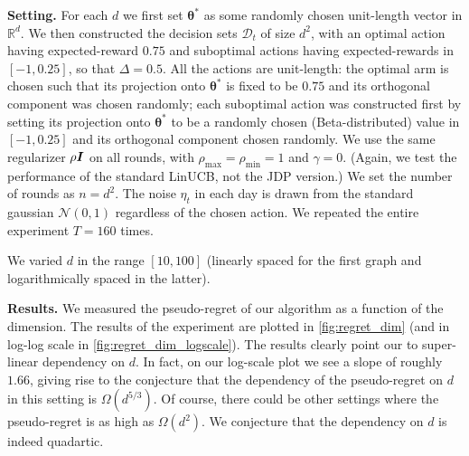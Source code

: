 \documentclass{article}
\renewcommand{\vec}[1]{\bm{#1}}
\newcommand{\Real}{\mathds{R}}
\newcommand{\D}{\mathcal{D}}
\newcommand{\Normal}{\mathcal{N}}
\newcommand{\Eye}[1][]{\bm{I}\notblank{#1}{_{{#1}\times{#1}}}{}}
\renewcommand{\paragraph}[1]{\vspace{2pt}\noindent\textbf{#1}}
\begin{document}
\paragraph{Setting.} For each $d$ we first set $\vec\theta^*$ as some randomly chosen unit-length vector in $\Real^d$. We then constructed the decision sets $\D_t$ of size
$d^2$, with an optimal action having expected-reward $0.75$ and suboptimal actions
having expected-rewards in $[-1, 0.25]$, so that $\Delta = 0.5$.  All the
actions are unit-length: the optimal arm is chosen such that its projection onto $\vec\theta^*$ is fixed to be $0.75$ and its orthogonal component was chosen randomly; each suboptimal action was constructed first by setting its projection onto $\vec \theta^*$ to be a randomly chosen (Beta-distributed) value in $[-1,0.25]$ and its orthogonal component chosen randomly.  We use the same
regularizer $\rho\Eye$ on all rounds, with
$\rho_{\max}=\rho_{\min}=1$ and $\gamma=0$. (Again, we test the performance of the standard LinUCB, not the JDP version.)  We set the number of
rounds as $n=d^2$. The noise $\eta_t$ in each day is drawn from the standard
gaussian $\Normal(0,1)$ regardless of the chosen action. We repeated the entire experiment $T=160$ times.

We varied $d$ in the range $[10, 100]$ (linearly spaced for the first
graph and logarithmically spaced in the latter).

\paragraph{Results.} We measured the pseudo-regret of our algorithm as
a function of the dimension. The results of the experiment are plotted
in \cref{fig:regret_dim} (and in log-log scale in \cref{fig:regret_dim_logscale}). The results clearly point our to super-linear dependency on $d$. In fact, on our log-scale plot we see a slope of roughly $1.66$, giving rise to the conjecture that the dependency of the pseudo-regret on $d$ in this setting is $\Omega(d^{5/3})$. Of course, there could be other settings where the pseudo-regret is as high as $\Omega(d^2)$. We conjecture that the dependency on $d$ is indeed quadartic.
\end{document}
